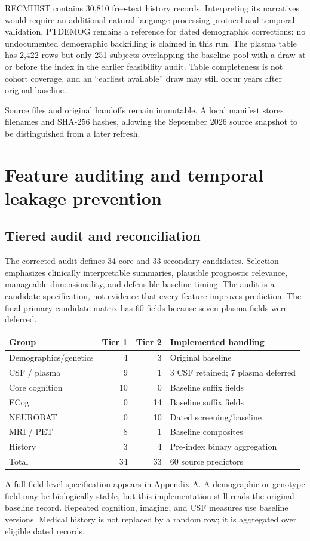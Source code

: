 \documentclass[11pt,a4paper]{article}
\begin{document}
RECMHIST contains 30,810 free-text history records. Interpreting its narratives would require an additional natural-language processing protocol and temporal validation. PTDEMOG remains a reference for dated demographic corrections; no undocumented demographic backfilling is claimed in this run. The plasma table has 2,422 rows but only 251 subjects overlapping the baseline pool with a draw at or before the index in the earlier feasibility audit. Table completeness is not cohort coverage, and an ``earliest available'' draw may still occur years after original baseline.

Source files and original handoffs remain immutable. A local manifest stores filenames and SHA-256 hashes, allowing the September 2026 source snapshot to be distinguished from a later refresh.

\clearpage
\section{Feature auditing and temporal leakage prevention}
\subsection{Tiered audit and reconciliation}
The corrected audit defines 34 core and 33 secondary candidates. Selection emphasizes clinically interpretable summaries, plausible prognostic relevance, manageable dimensionality, and defensible baseline timing. The audit is a candidate specification, not evidence that every feature improves prediction. The final primary candidate matrix has 60 fields because seven plasma fields were deferred.
\begin{center}\small
\begin{tabular}{p{.27\linewidth}rrp{.40\linewidth}}\hline
Group & Tier 1 & Tier 2 & Implemented handling\\\hline
Demographics/genetics & 4 & 3 & Original baseline\\
CSF / plasma & 9 & 1 & 3 CSF retained; 7 plasma deferred\\
Core cognition & 10 & 0 & Baseline suffix fields\\
ECog & 0 & 14 & Baseline suffix fields\\
NEUROBAT & 0 & 10 & Dated screening/baseline\\
MRI / PET & 8 & 1 & Baseline composites\\
History & 3 & 4 & Pre-index binary aggregation\\
Total & 34 & 33 & 60 source predictors\\
\hline\end{tabular}\end{center}
A full field-level specification appears in Appendix A. A demographic or genotype field may be biologically stable, but this implementation still reads the original baseline record. Repeated cognition, imaging, and CSF measures use baseline versions. Medical history is not replaced by a random row; it is aggregated over eligible dated records.
\end{document}
